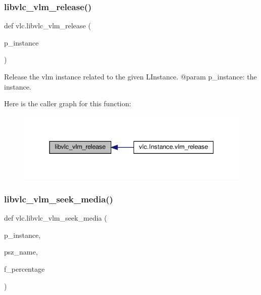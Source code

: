 \subsubsection{\texorpdfstring{libvlc\+\_\+vlm\+\_\+release()}{libvlc\_vlm\_release()}}
{\footnotesize\ttfamily def vlc.\+libvlc\+\_\+vlm\+\_\+release (\begin{DoxyParamCaption}\item[{}]{p\+\_\+instance }\end{DoxyParamCaption})}

\begin{DoxyVerb}Release the vlm instance related to the given L{Instance}.
@param p_instance: the instance.
\end{DoxyVerb}
 Here is the caller graph for this function\+:
\nopagebreak
\begin{figure}[H]
\begin{center}
\leavevmode
\includegraphics[width=338pt]{namespacevlc_a4aa32acd52d832cb9637629d14af97fb_icgraph}
\end{center}
\end{figure}
\mbox{\label{namespacevlc_a0cdf20f1c8371b2f626c6bee76089a91}} 
\subsubsection{\texorpdfstring{libvlc\+\_\+vlm\+\_\+seek\+\_\+media()}{libvlc\_vlm\_seek\_media()}}
{\footnotesize\ttfamily def vlc.\+libvlc\+\_\+vlm\+\_\+seek\+\_\+media (\begin{DoxyParamCaption}\item[{}]{p\+\_\+instance,  }\item[{}]{psz\+\_\+name,  }\item[{}]{f\+\_\+percentage }\end{DoxyParamCaption})}

